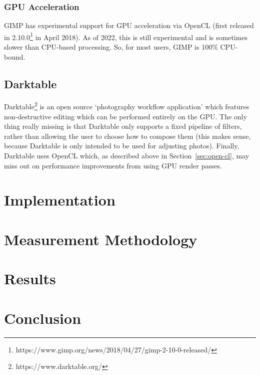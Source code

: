 \documentclass[12pt]{article}
\begin{document}
\subsubsection{GPU Acceleration}

GIMP has experimental support for GPU acceleration via OpenCL (first released in
2.10.0\footnote{https://www.gimp.org/news/2018/04/27/gimp-2-10-0-released/} in April 2018).  As of
2022, this is still experimental and is sometimes slower than CPU-based processing.  So, for most
users, GIMP is 100\% CPU-bound.

\subsection{Darktable}

Darktable\footnote{https://www.darktable.org/} is an open source `photography workflow application'
which features non-destructive editing which can be performed entirely on the GPU.  The only thing
really missing is that Darktable only supports a fixed pipeline of filters, rather than allowing the
user to choose how to compose them (this makes sense, because Darktable is only intended to be used
for adjusting photos).  Finally, Darktable uses OpenCL which, as described above in
Section~\ref{sec:open-cl}, may miss out on performance improvements from using GPU render passes.




\section{Implementation}



\section{Measurement Methodology}

\section{Results}

\section{Conclusion}



\pagebreak

\begin{thebibliography}{99}
\end{thebibliography}
\end{document}
